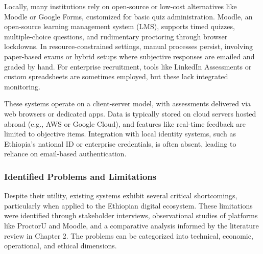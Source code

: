 Locally, many institutions rely on open-source or low-cost alternatives like Moodle or Google Forms, customized for basic quiz administration. Moodle, an open-source learning management system (LMS), supports timed quizzes, multiple-choice questions, and rudimentary proctoring through browser lockdowns. In resource-constrained settings, manual processes persist, involving paper-based exams or hybrid setups where subjective responses are emailed and graded by hand. For enterprise recruitment, tools like LinkedIn Assessments or custom spreadsheets are sometimes employed, but these lack integrated monitoring.

\begin{sloppypar}
These systems operate on a client-server model, with assessments delivered via web browsers or dedicated apps. Data is typically stored on cloud servers hosted abroad (e.g., AWS or Google Cloud), and features like real-time feedback are limited to objective items. Integration with local identity systems, such as Ethiopia's national ID or enterprise credentials, is often absent, leading to reliance on email-based authentication.
\end{sloppypar}

\subsubsection{Identified Problems and Limitations}
Despite their utility, existing systems exhibit several critical shortcomings, particularly when applied to the Ethiopian digital ecosystem. These limitations were identified through stakeholder interviews, observational studies of platforms like ProctorU and Moodle, and a comparative analysis informed by the literature review in Chapter 2. The problems can be categorized into technical, economic, operational, and ethical dimensions.

